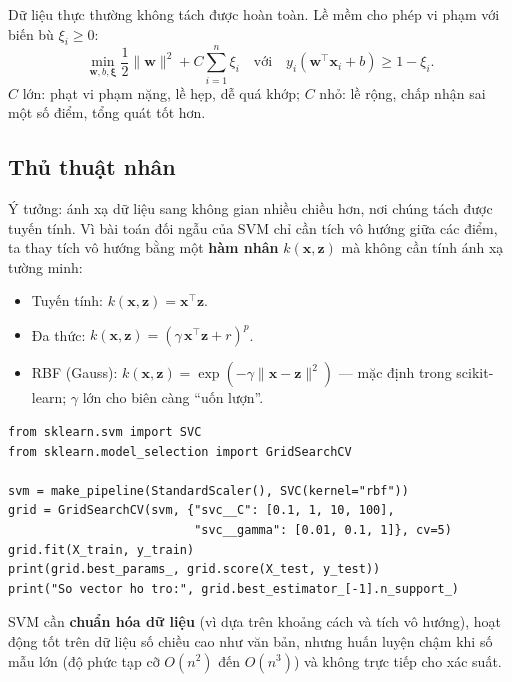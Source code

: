 Dữ liệu thực thường không tách được hoàn toàn. Lề mềm cho phép vi phạm với biến bù $\xi_i \geq 0$:
\begin{equation}
    \min_{\mathbf{w}, b, \boldsymbol{\xi}} \frac{1}{2}\|\mathbf{w}\|^2 + C\sum_{i=1}^{n}\xi_i \quad \text{với} \quad y_i(\mathbf{w}^\top\mathbf{x}_i + b) \geq 1 - \xi_i .
\end{equation}
$C$ lớn: phạt vi phạm nặng, lề hẹp, dễ quá khớp; $C$ nhỏ: lề rộng, chấp nhận sai một số điểm, tổng quát tốt hơn.

\subsection{Thủ thuật nhân}

Ý tưởng: ánh xạ dữ liệu sang không gian nhiều chiều hơn, nơi chúng tách được tuyến tính. Vì bài toán đối ngẫu của SVM chỉ cần tích vô hướng giữa các điểm, ta thay tích vô hướng bằng một \textbf{hàm nhân} $k(\mathbf{x}, \mathbf{z})$ mà không cần tính ánh xạ tường minh:
\begin{itemize}
    \item Tuyến tính: $k(\mathbf{x}, \mathbf{z}) = \mathbf{x}^\top\mathbf{z}$.
    \item Đa thức: $k(\mathbf{x}, \mathbf{z}) = (\gamma\,\mathbf{x}^\top\mathbf{z} + r)^p$.
    \item RBF (Gauss): $k(\mathbf{x}, \mathbf{z}) = \exp(-\gamma\|\mathbf{x} - \mathbf{z}\|^2)$ --- mặc định trong scikit-learn; $\gamma$ lớn cho biên càng ``uốn lượn''.
\end{itemize}


\begin{lstlisting}[caption={SVM với tìm kiếm tham số C và gamma}]
from sklearn.svm import SVC
from sklearn.model_selection import GridSearchCV

svm = make_pipeline(StandardScaler(), SVC(kernel="rbf"))
grid = GridSearchCV(svm, {"svc__C": [0.1, 1, 10, 100],
                          "svc__gamma": [0.01, 0.1, 1]}, cv=5)
grid.fit(X_train, y_train)
print(grid.best_params_, grid.score(X_test, y_test))
print("So vector ho tro:", grid.best_estimator_[-1].n_support_)
\end{lstlisting}

SVM cần \textbf{chuẩn hóa dữ liệu} (vì dựa trên khoảng cách và tích vô hướng), hoạt động tốt trên dữ liệu số chiều cao như văn bản, nhưng huấn luyện chậm khi số mẫu lớn (độ phức tạp cỡ $O(n^2)$ đến $O(n^3)$) và không trực tiếp cho xác suất.

